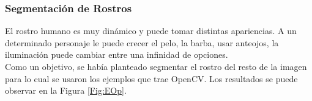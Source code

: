 \documentclass[letterpaper,12pt]{article}
\begin{document}
\subsubsection{Segmentación de Rostros}
 
 El rostro humano es muy dinámico y puede tomar distintas apariencias. A un determinado personaje le puede crecer el pelo, la barba, usar anteojos, la iluminación puede cambiar entre una infinidad de opciones.\\
 Como un objetivo, se había planteado segmentar el rostro del resto de la imagen para lo cual se usaron los ejemplos que trae OpenCV. Los resultados se puede observar en la Figura \ref{Fig:EOp}.
\begin{figure}[H]
\centering
{}

\end{figure}
\end{document}
